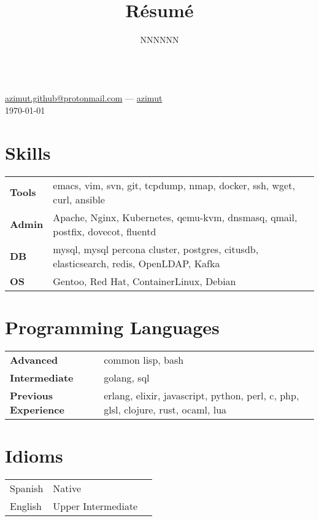 \documentclass[11pt]{article}
\makeatletter
\renewcommand{\maketitle}{
  \begin{center}{\huge\bfseries\theauthor} \\
    \vspace{.25em}
    {\faEnvelope} \href {mailto:azimut.github@protonmail.com} {azimut.github@protonmail.com}
    ---
    {\faGithub} \href {https://github.com/azimut} {azimut} \\
    \vspace{.25em}
    \today
  \end{center}
}
\makeatother
\begin{document}
\title{R\'esum\'e}
\author{NNNNNN}
\maketitle


\section{Skills}


\begin{tabular}{@{}lll@{}}
  \hspace{.1em} \textbf{Tools} & emacs, vim, svn, git, tcpdump, nmap, docker, ssh, wget, curl, ansible \\
  \hspace{.1em} \textbf{Admin} & Apache, Nginx, Kubernetes, qemu-kvm, dnsmasq, qmail, postfix, dovecot, fluentd \\
  \hspace{.1em} \textbf{DB}    & mysql, mysql percona cluster, postgres, citusdb, elasticsearch, redis, OpenLDAP, Kafka \\
  \hspace{.1em} \textbf{OS}    & Gentoo, Red Hat, ContainerLinux, Debian \\
\end{tabular}


\section{Programming Languages}


\begin{tabular}{@{}lll@{}}
  \hspace{.1em} \textbf{Advanced} & common lisp, bash \\
  \hspace{.1em} \textbf{Intermediate} & golang, sql \\
  \hspace{.1em} \textbf{Previous Experience} & erlang, elixir, javascript, python, perl, c, php, glsl, clojure, rust, ocaml, lua \\
\end{tabular}


\section{Idioms}


\begin{tabular}{@{}lll@{}}
  \hspace{.1em} Spanish & Native \\
  \hspace{.1em} English & Upper Intermediate
  \\
\end{tabular}
\end{document}
